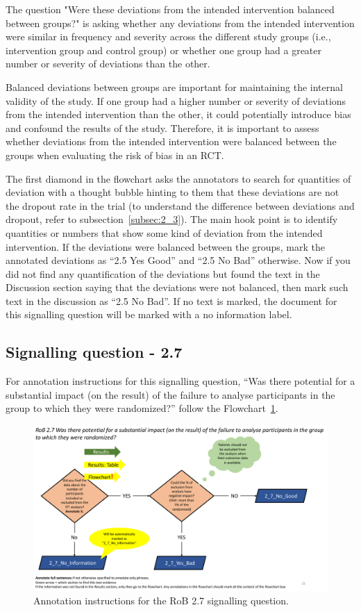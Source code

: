 \documentclass[sn-mathphys,Numbered]{sn-jnl}%
\begin{document}
The question "Were these deviations from the intended intervention balanced between groups?" is asking whether any deviations from the intended intervention were similar in frequency and severity across the different study groups (i.e., intervention group and control group) or whether one group had a greater number or severity of deviations than the other.

Balanced deviations between groups are important for maintaining the internal validity of the study. If one group had a higher number or severity of deviations from the intended intervention than the other, it could potentially introduce bias and confound the results of the study. Therefore, it is important to assess whether deviations from the intended intervention were balanced between the groups when evaluating the risk of bias in an RCT.

The first diamond in the flowchart asks the annotators to search for quantities of deviation with a thought bubble hinting to them that these deviations are not the dropout rate in the trial (to understand the difference between deviations and dropout, refer to subsection~\ref{subsec:2_3}).
The main hook point is to identify quantities or numbers that show some kind of deviation from the intended intervention.
If the deviations were balanced between the groups, mark the annotated deviations as ``2.5 Yes Good'' and ``2.5 No Bad'' otherwise.
Now if you did not find any quantification of the deviations but found the text in the Discussion section saying that the deviations were not balanced, then mark such text in the discussion as ``2.5 No Bad''.
If no text is marked, the document for this signalling question will be marked with a no information label.
%
%
%
%
\subsection*{Signalling question - 2.7 }
%
For annotation instructions for this signalling question, ``Was there potential for a substantial impact (on the result) of the failure to analyse participants in the group to which they were randomized?'' follow the Flowchart~\ref{fig:2_7}.
%
\begin{figure}[hbt]
    \centering
    \includegraphics[width=\textwidth]{figures/2_7.pdf}
    \caption{Annotation instructions for the RoB 2.7 signalling question.}
    \label{fig:2_7}
\end{figure}
\end{document}
